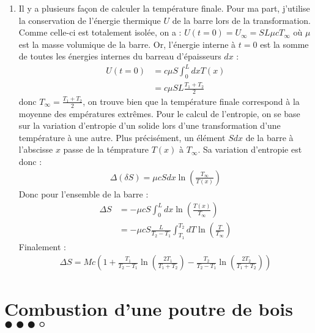 \begin{correction}
\begin{enumerate}
\begin{enumerate}
	\item Il y a plusieurs façon de calculer la température finale. Pour ma part, j'utilise la conservation de l'énergie thermique $U$ de la barre lors de la transformation. Comme celle-ci est totalement isolée, on a :
	$U(t=0)=U_\infty=SL\mu c T_\infty$ où $\mu$ est la masse volumique de la barre.
	Or, l'énergie interne à $t=0$ est la somme de toutes les énergies internes du barreau d'épaisseurs $dx$ :
	\begin{align*}
		U(t=0) &= c\mu S\int_0^LdxT(x) \\
		&=c\mu SL\frac{T_1+T_2}{2}
	\end{align*}
	donc $T_\infty = \frac{T_1+T_2}{2}$, on trouve bien que la température finale correspond à la moyenne des empératures extrêmes. 
	Pour le calcul de l'entropie, on se base sur la variation d'entropie d'un solide lors d'une transformation d'une température à une autre. Plus précisément, un élément $Sdx$ de la barre à l'abscisse $x$ passe de la témprature $T(x)$ à $T_\infty$. Sa variation d'entropie est donc :
	\begin{align*}
		\Delta (\delta S) = \mu c S dx \ln\left(\frac{T_\infty}{T(x)} \right) 
	\end{align*}
	Donc pour l'ensemble de la barre :
	\begin{align*}
		\Delta S &= -\mu c S \int_0^Ldx \ln\left(\frac{T(x)}{T_\infty} \right) \\
		& = -\mu c S\frac{L}{T_2-T_1}\int_{T_1}^{T_2}dT\ln\left(\frac{T}{T_\infty}\right)
	\end{align*}
Finalement : 
\begin{align*}
\Delta S = Mc \left( 1 + \frac{T_1}{T_2-T_1}\ln\left(\frac{2T_1}{T_1+T_2}\right) - \frac{T_2}{T_2-T_1}\ln\left(\frac{2T_2}{T_1+T_2}\right)\right)
\end{align*}

\end{enumerate}

\end{enumerate}

\end{correction}

\newpage

\section{Combustion d'une poutre de bois $\bullet\bullet\bullet\circ$}

